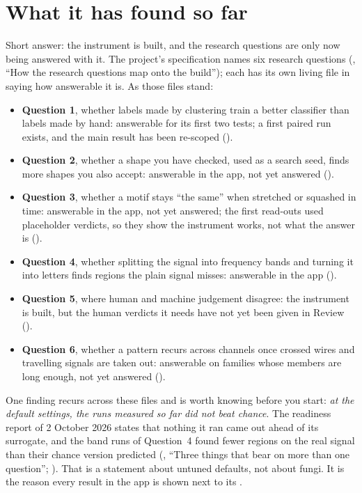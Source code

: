 \section{What it has found so far}\label{sec:why-found}
Short answer: the instrument is built, and the research questions are only now being
answered with it. The project's specification names six research questions
(, ``How the research questions map onto the build''); each has
its own living file in  saying how answerable it is. As those files
stand:
\begin{itemize}
  \item \textbf{Question 1}, whether labels made by clustering train a better classifier than
    labels made by hand: answerable for its first two tests; a first paired run exists, and
    the main result has been re-scoped ().
  \item \textbf{Question 2}, whether a shape you have checked, used as a search seed, finds
    more shapes you also accept: answerable in the app, not yet answered
    ().
  \item \textbf{Question 3}, whether a motif stays ``the same'' when stretched or squashed in
    time: answerable in the app, not yet answered; the first read-outs used placeholder
    verdicts, so they show the instrument works, not what the answer is
    ().
  \item \textbf{Question 4}, whether splitting the signal into frequency bands and turning it
    into letters finds regions the plain signal misses: answerable in the app
    ().
  \item \textbf{Question 5}, where human and machine judgement disagree: the instrument is
    built, but the human verdicts it needs have not yet been given in Review
    ().
  \item \textbf{Question 6}, whether a pattern recurs across channels once crossed wires and
    travelling signals are taken out: answerable on families whose members are long enough,
    not yet answered ().
\end{itemize}

One finding recurs across these files and is worth knowing before you start:
\emph{at the default settings, the runs measured so far did not beat chance}. The readiness
report of 2 October 2026 states that nothing it ran came out ahead of its surrogate, and the
band runs of Question~4 found fewer regions on the real signal than their chance version
predicted (, ``Three things that bear on more than one
question''; ). That is a statement about
untuned defaults, not about fungi. It is the reason every result in the app is shown next to
its .

